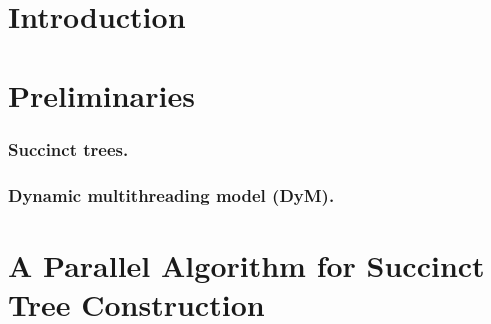 \documentclass[runningheads]{llncs}
\begin{document}
\section{Introduction}
\label{sec:introduction}




\section{Preliminaries}
\label{sec:relwork}


\subsubsection{Succinct trees.}
\label{subsec:suctrees}


\subsubsection{Dynamic multithreading model (DyM).}
\label{subsec:dym}


%


\section{A Parallel Algorithm for Succinct Tree Construction}
\label{sec:multicoreST}
%
%

\end{document}
